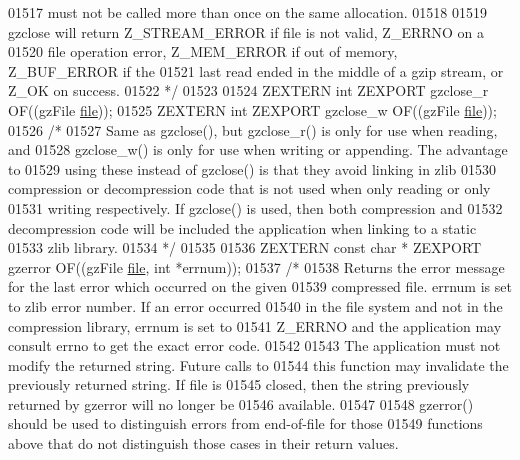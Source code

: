 \begin{DoxyCode}
01517 \textcolor{comment}{   must not be called more than once on the same allocation.}
01518 \textcolor{comment}{}
01519 \textcolor{comment}{     gzclose will return Z\_STREAM\_ERROR if file is not valid, Z\_ERRNO on a}
01520 \textcolor{comment}{   file operation error, Z\_MEM\_ERROR if out of memory, Z\_BUF\_ERROR if the}
01521 \textcolor{comment}{   last read ended in the middle of a gzip stream, or Z\_OK on success.}
01522 \textcolor{comment}{*/}
01523 
01524 ZEXTERN \textcolor{keywordtype}{int} ZEXPORT gzclose\_r OF((gzFile \hyperlink{structfile}{file}));
01525 ZEXTERN \textcolor{keywordtype}{int} ZEXPORT gzclose\_w OF((gzFile \hyperlink{structfile}{file}));
01526 \textcolor{comment}{/*}
01527 \textcolor{comment}{     Same as gzclose(), but gzclose\_r() is only for use when reading, and}
01528 \textcolor{comment}{   gzclose\_w() is only for use when writing or appending.  The advantage to}
01529 \textcolor{comment}{   using these instead of gzclose() is that they avoid linking in zlib}
01530 \textcolor{comment}{   compression or decompression code that is not used when only reading or only}
01531 \textcolor{comment}{   writing respectively.  If gzclose() is used, then both compression and}
01532 \textcolor{comment}{   decompression code will be included the application when linking to a static}
01533 \textcolor{comment}{   zlib library.}
01534 \textcolor{comment}{*/}
01535 
01536 ZEXTERN \textcolor{keyword}{const} \textcolor{keywordtype}{char} * ZEXPORT gzerror OF((gzFile \hyperlink{structfile}{file}, \textcolor{keywordtype}{int} *errnum));
01537 \textcolor{comment}{/*}
01538 \textcolor{comment}{     Returns the error message for the last error which occurred on the given}
01539 \textcolor{comment}{   compressed file.  errnum is set to zlib error number.  If an error occurred}
01540 \textcolor{comment}{   in the file system and not in the compression library, errnum is set to}
01541 \textcolor{comment}{   Z\_ERRNO and the application may consult errno to get the exact error code.}
01542 \textcolor{comment}{}
01543 \textcolor{comment}{     The application must not modify the returned string.  Future calls to}
01544 \textcolor{comment}{   this function may invalidate the previously returned string.  If file is}
01545 \textcolor{comment}{   closed, then the string previously returned by gzerror will no longer be}
01546 \textcolor{comment}{   available.}
01547 \textcolor{comment}{}
01548 \textcolor{comment}{     gzerror() should be used to distinguish errors from end-of-file for those}
01549 \textcolor{comment}{   functions above that do not distinguish those cases in their return values.}

\end{DoxyCode}
